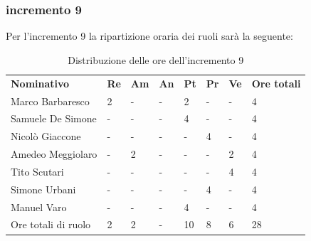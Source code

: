 \subsubsection{incremento 9}
Per l'incremento 9 la ripartizione oraria dei ruoli sarà la seguente:
\begin{center}
    \begin{table}[ht!]
        \centering
        \caption{Distribuzione delle ore dell'incremento 9}
        \vspace{5px}
        \renewcommand{\arraystretch}{1.8}
        \begin{tabular}{p{100px} p{20px} p{20px} p{20px} p{20px} p{20px} p{20px} p{50px} }
            \rowcolor{logo!70} \textbf{Nominativo} & \textbf{Re} & \textbf{Am} & \textbf{An} & \textbf{Pt} & \textbf{Pr} & \textbf{Ve} & \textbf{Ore totali} \\
            Marco Barbaresco                       & 2           & -           & -           & 2           & -           & -           & 4                   \\
            Samuele De Simone                      & -           & -           & -           & 4           & -           & -           & 4                   \\
            Nicolò Giaccone                        & -           & -           & -           & -           & 4           & -           & 4                   \\
            Amedeo Meggiolaro                      & -           & 2           & -           & -           & -           & 2           & 4                   \\
            Tito Scutari                           & -           & -           & -           & -           & -           & 4           & 4                   \\
            Simone Urbani                          & -           & -           & -           & -           & 4           & -           & 4                   \\
            Manuel Varo                            & -           & -           & -           & 4           & -           & -           & 4                   \\
            Ore totali di ruolo                    & 2           & 2           & -           & 10          & 8           & 6           & 28                  \\
        \end{tabular}
    \end{table}
\end{center}
